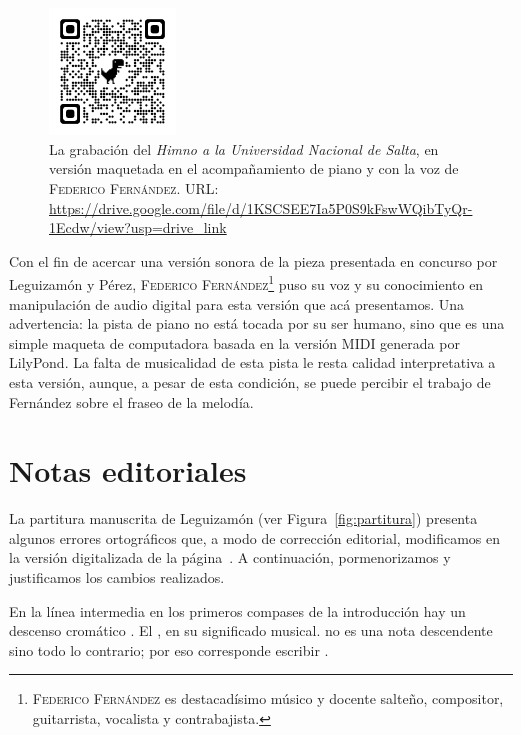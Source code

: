\begin{figure}[H]
\centering
\includegraphics[width=0.3\textwidth]{img/qrcode-himno-fernandez}
\caption[La grabación del \emph{Himno}.]{La grabación del \emph{Himno a la Universidad Nacional de Salta}, en versión maquetada en el acompañamiento de piano y con la voz de \textsc{Federico Fernández}. URL: \url{https://drive.google.com/file/d/1KSCSEE7Ia5P0S9kFswWQibTyQr-1Ecdw/view?usp=drive_link}}
\label{fig:grabacion}
\end{figure}

Con el fin de acercar una versión sonora de la pieza presentada en concurso por Leguizamón y Pérez, \textsc{Federico Fernández}\footnote{\textsc{Federico Fernández} es destacadísimo músico y docente salteño, compositor, guitarrista, vocalista y contrabajista.} puso su voz y su conocimiento en manipulación de audio digital para esta versión que acá presentamos. Una advertencia: la pista de piano no está tocada por su ser humano, sino que es una simple maqueta de computadora basada en la versión MIDI generada por LilyPond. La falta de musicalidad de esta pista le resta calidad interpretativa a esta versión, aunque, a pesar de esta condición, se puede percibir el trabajo de Fernández sobre el fraseo de la melodía.


\section{Notas editoriales}
\label{sec:notas-editoriales}

La partitura manuscrita de Leguizamón (ver Figura~\ref{fig:partitura}) presenta algunos errores ortográficos que, a modo de corrección editorial, modificamos en la versión digitalizada de la página~\pageref{partitura-digitalizada}. A continuación, pormenorizamos y justificamos los cambios realizados.

En la línea intermedia en los primeros compases de la introducción hay un descenso cromático \hbox{.} El \hbox{,} en su significado musical. no es una nota descendente sino todo lo contrario; por eso corresponde escribir \hbox{.}

